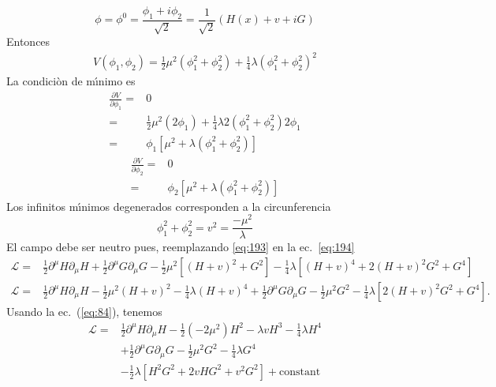 \begin{equation}
  \label{eq:193}
  \phi=\phi^0=\frac{\phi_1+i\phi_2}{\sqrt{2}}=\frac{1}{\sqrt{2}}(H(x)+v+iG)
\end{equation}
Entonces
\begin{align}
  \label{eq:194}
  V(\phi_1,\phi_2)=\tfrac{1}{2}\mu^2\left(\phi_1^2+\phi_2^2\right)
+\tfrac{1}{4}\lambda\left(\phi_1^2+\phi_2^2\right)^2
\end{align}
La condici\`on de m\'\i nimo es 
\begin{align}
  \frac{\partial V}{\partial\phi_1}=&0\nonumber\\
  =&\tfrac{1}{2}\mu^2\left(2\phi_1\right)
+\tfrac{1}{4}\lambda2\left(\phi_1^2+\phi_2^2\right)2\phi_1\nonumber\\
  =&\phi_1\left[\mu^2+\lambda\left(\phi_1^2+\phi_2^2\right)\right]
\end{align}
\begin{align}
  \frac{\partial V}{\partial\phi_2}=&0\nonumber\\
  =&\phi_2\left[\mu^2+\lambda\left(\phi_1^2+\phi_2^2\right)\right]
\end{align}
Los infinitos m\'\i nimos degenerados corresponden a la circunferencia
\begin{equation}
\phi_1^2+\phi_2^2=v^2=\frac{-\mu^2}{\lambda}
\end{equation}
El campo debe ser neutro pues, reemplazando \eqref{eq:193} en la ec.~\eqref{eq:194}
\begin{align}
  \mathcal{L}=&\tfrac{1}{2}\partial^\mu H\partial_\mu H+\tfrac{1}{2}\partial^\mu G\partial_\mu G-\tfrac{1}{2}\mu^2\left[(H+v)^2+G^2\right]-\tfrac{1}{4}\lambda\left[(H+v)^4+2(H+v)^2G^2+G^4\right]\nonumber\\
  \mathcal{L}=&\tfrac{1}{2}\partial^\mu H\partial_\mu H-\tfrac{1}{2}\mu^2(H+v)^2-\tfrac{1}{4}\lambda(H+v)^4+\tfrac{1}{2}\partial^\mu G\partial_\mu G-\tfrac{1}{2}\mu^2G^2-\tfrac{1}{4}\lambda\left[2(H+v)^2G^2+G^4\right].
\end{align}
Usando la ec.~(\ref{eq:84}), tenemos
\begin{align}
  \mathcal{L}=&\tfrac{1}{2}\partial^\mu H\partial_\mu H-\tfrac{1}{2}\left(-2\mu^2\right)H^2-\lambda vH^3-\tfrac{1}{4}\lambda H^4\nonumber\\
  &+\tfrac{1}{2}\partial^\mu G\partial_\mu G-\tfrac{1}{2}\mu^2G^2-\tfrac{1}{4}\lambda G^4\nonumber\\
  &-\tfrac{1}{2}\lambda\left[H^2G^2+2vHG^2+v^2G^2\right]+\text{constant}\nonumber\\
\end{align}
